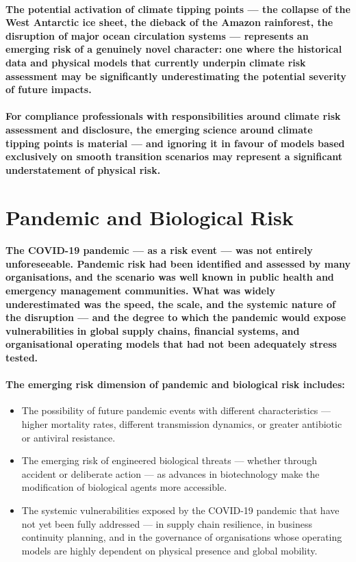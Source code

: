 \paragraph{The potential activation of climate tipping points — the collapse of the West Antarctic ice sheet, the dieback of the Amazon rainforest, the disruption of major ocean circulation systems — represents an emerging risk of a genuinely novel character: one where the historical data and physical models that currently underpin climate risk assessment may be significantly underestimating the potential severity of future impacts.}
\paragraph{For compliance professionals with responsibilities around climate risk assessment and disclosure, the emerging science around climate tipping points is material — and ignoring it in favour of models based exclusively on smooth transition scenarios may represent a significant understatement of physical risk.}

\section{Pandemic and Biological Risk}
\paragraph{The COVID-19 pandemic — as a risk event — was not entirely unforeseeable. Pandemic risk had been identified and assessed by many organisations, and the scenario was well known in public health and emergency management communities. What was widely underestimated was the speed, the scale, and the systemic nature of the disruption — and the degree to which the pandemic would expose vulnerabilities in global supply chains, financial systems, and organisational operating models that had not been adequately stress tested.}
\paragraph{The emerging risk dimension of pandemic and biological risk includes:}
\begin{itemize}
    \item{The possibility of future pandemic events with different characteristics — higher mortality rates, different transmission dynamics, or greater antibiotic or antiviral resistance.}
    \item{The emerging risk of engineered biological threats — whether through accident or deliberate action — as advances in biotechnology make the modification of biological agents more accessible.}
    \item{The systemic vulnerabilities exposed by the COVID-19 pandemic that have not yet been fully addressed — in supply chain resilience, in business continuity planning, and in the governance of organisations whose operating models are highly dependent on physical presence and global mobility.}
\end{itemize}

